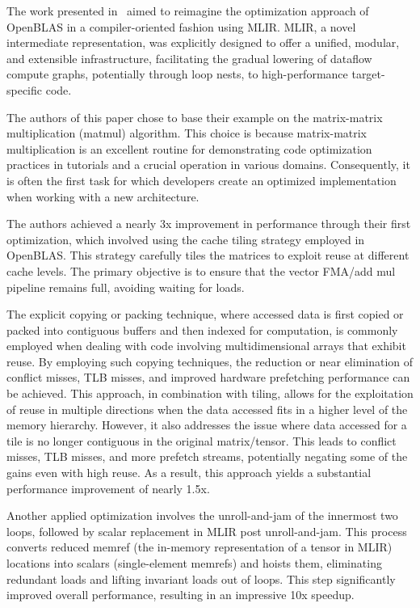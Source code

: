 The work presented in~\cite{DBLP:journals/corr/abs-2003-00532} aimed to reimagine the optimization approach of OpenBLAS in a compiler-oriented fashion using MLIR.
MLIR, a novel intermediate representation, was explicitly designed to offer a unified, modular, and extensible infrastructure, facilitating the gradual lowering of dataflow compute graphs, potentially through loop nests, to high-performance target-specific code.

The authors of this paper chose to base their example on the matrix-matrix multiplication (matmul) algorithm.
This choice is because matrix-matrix multiplication is an excellent routine for demonstrating code optimization practices in tutorials and a crucial operation in various domains.
Consequently, it is often the first task for which developers create an optimized implementation when working with a new architecture.

The authors achieved a nearly 3x improvement in performance through their first optimization, which involved using the cache tiling strategy employed in OpenBLAS.
This strategy carefully tiles the matrices to exploit reuse at different cache levels.
The primary objective is to ensure that the vector FMA/add mul pipeline remains full, avoiding waiting for loads.

The explicit copying or packing technique, where accessed data is first copied or packed into contiguous buffers and then indexed for computation, is commonly employed when dealing with code involving multidimensional arrays that exhibit reuse.
By employing such copying techniques, the reduction or near elimination of conflict misses, TLB misses, and improved hardware prefetching performance can be achieved.
This approach, in combination with tiling, allows for the exploitation of reuse in multiple directions when the data accessed fits in a higher level of the memory hierarchy.
However, it also addresses the issue where data accessed for a tile is no longer contiguous in the original matrix/tensor.
This leads to conflict misses, TLB misses, and more prefetch streams, potentially negating some of the gains even with high reuse.
As a result, this approach yields a substantial performance improvement of nearly 1.5x.

Another applied optimization involves the unroll-and-jam of the innermost two loops, followed by scalar replacement in MLIR post unroll-and-jam.
This process converts reduced memref (the in-memory representation of a tensor in MLIR) locations into scalars (single-element memrefs) and hoists them, eliminating redundant loads and lifting invariant loads out of loops.
This step significantly improved overall performance, resulting in an impressive 10x speedup.

